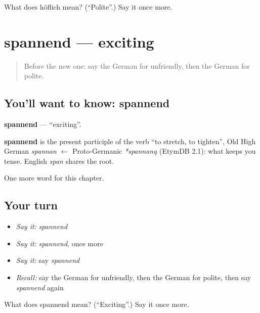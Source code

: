 \begin{tcolorbox}[breakable,colback=teal!4,colframe=teal!35!black,title={Before you move on}]
What does höflich mean? (\textquotedblleft{}Polite\textquotedblright{}.) Say it once more.
\end{tcolorbox}
\section[spannend]{spannend — exciting}

\label{lesson:GE-C167-spannend}



\begin{quote}
Before the new one: say the German for unfriendly, then the German for polite.
\end{quote}

\subsection*{You'll want to know: spannend}
\textbf{spannend} — \textquotedblleft{}exciting\textquotedblright{}.

\begin{cousinweb}
\textbf{spannend} is the present participle of the verb \textquotedblleft{}to stretch, to tighten\textquotedblright{}, Old High German \emph{spannan} $\leftarrow$ Proto-Germanic \emph{*spannaną} (EtymDB 2.1): what keeps you tense. English \emph{span} shares the root.
\end{cousinweb}

\begin{grammarlens}[title={What you've built}]
One more word for this chapter.
\end{grammarlens}

\subsection*{Your turn}
\begin{itemize}
\raggedright
  \item \emph{Say it:} \emph{spannend}
  \item \emph{Say it:} \emph{spannend}, once more
  \item \emph{Say it:} say \emph{spannend}
  \item \emph{Recall:} say the German for unfriendly, then the German for polite, then say \emph{spannend} again
\end{itemize}

\begin{tcolorbox}[breakable,colback=teal!4,colframe=teal!35!black,title={Before you move on}]
What does spannend mean? (\textquotedblleft{}Exciting\textquotedblright{}.) Say it once more.
\end{tcolorbox}
